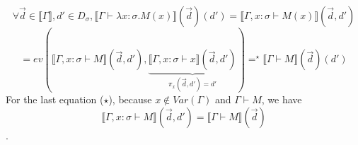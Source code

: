 $$ \forall \vec{d} \in \llbracket \Gamma \rrbracket, d' \in D_\sigma, \llbracket \Gamma \vdash \lambda x : \sigma . M(x) \rrbracket (\vec{d})(d') = \llbracket \Gamma , x:\sigma \vdash M(x) \rrbracket (\vec{d}, d') $$
$$ = ev(\llbracket \Gamma , x:\sigma \vdash M \rrbracket (\vec{d}, d'), \underbrace{\llbracket \Gamma , x:\sigma \vdash x \rrbracket(\vec{d}, d')}_{\pi_x(\vec{d}, d') = d'}) =^\star \llbracket \Gamma \vdash M \rrbracket (\vec{d})(d')$$
For the last equation ($\star$), because $x \notin Var(\Gamma)$ and $\Gamma \vdash M$, we have $$\llbracket \Gamma , x:\sigma \vdash M \rrbracket (\vec{d},d') = \llbracket \Gamma \vdash M \rrbracket (\vec{d})$$.